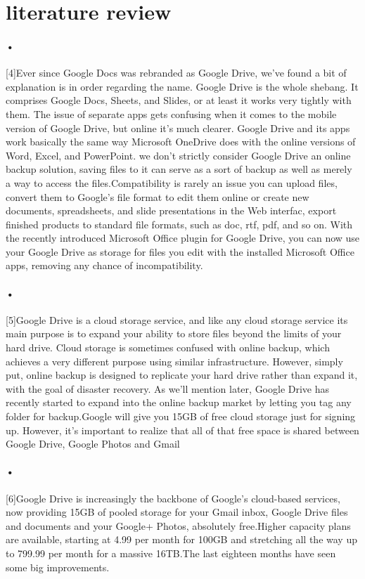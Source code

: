 \documentclass[11pt]{article}
\begin{document}
\section{literature review}
\paragraph{•}
[4]Ever since Google Docs was rebranded as Google Drive, we've found a bit of explanation is in order regarding the name. Google Drive is the whole shebang. It comprises Google Docs, Sheets, and Slides, or at least it works very tightly with them. The issue of separate apps gets confusing when it comes to the mobile version of Google Drive, but online it's much clearer. Google Drive and its apps work basically the same way Microsoft OneDrive does with the online versions of Word, Excel, and PowerPoint. we don't strictly consider Google Drive an online backup solution, saving files to it can serve as a sort of backup as well as merely a way to access the files.Compatibility is rarely an issue you can upload files, convert them to Google's file format to edit them online or create new documents, spreadsheets, and slide presentations in the Web interfac, export finished products to standard file formats, such as doc, rtf, pdf, and so on. With the recently introduced Microsoft Office plugin for Google Drive, you can now use your Google Drive as storage for files you edit with the installed Microsoft Office apps, removing any chance of incompatibility.

\paragraph{•}
[5]Google Drive is a cloud storage service, and like any cloud storage service its main purpose is to expand your ability to store files beyond the limits of your hard drive. Cloud storage is sometimes confused with online backup, which achieves a very different purpose using similar infrastructure. However, simply put, online backup is designed to replicate your hard drive rather than expand it, with the goal of disaster recovery. As we’ll mention later, Google Drive has recently started to expand into the online backup market by letting you tag any folder for backup.Google will give you 15GB of free cloud storage just for signing up. However, it’s important to realize that all of that free space is shared between Google Drive, Google Photos and Gmail
\paragraph{•}
[6]Google Drive is increasingly the backbone of Google’s cloud-based services, now providing 15GB of pooled storage for your Gmail inbox, Google Drive files and documents and your Google+ Photos, absolutely free.Higher capacity plans are available, starting at 4.99 per month for 100GB and stretching all the way up to 799.99 per month for a massive 16TB.The last eighteen months have seen some big improvements.
\end{document}
